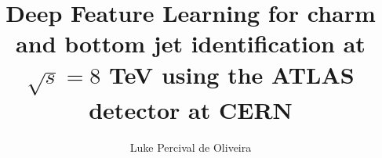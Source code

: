 \title{Deep Feature Learning for charm and bottom jet identification at $\sqrt{s} = 8$ TeV using the ATLAS detector at CERN}
\author{Luke Percival de Oliveira}




